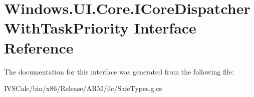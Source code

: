 \hypertarget{interface_windows_1_1_u_i_1_1_core_1_1_i_core_dispatcher_with_task_priority}{}\section{Windows.\+U\+I.\+Core.\+I\+Core\+Dispatcher\+With\+Task\+Priority Interface Reference}
\label{interface_windows_1_1_u_i_1_1_core_1_1_i_core_dispatcher_with_task_priority}


The documentation for this interface was generated from the following file\+:\begin{DoxyCompactItemize}
\item 
I\+V\+S\+Calc/bin/x86/\+Release/\+A\+R\+M/ilc/Safe\+Types.\+g.\+cs\end{DoxyCompactItemize}
